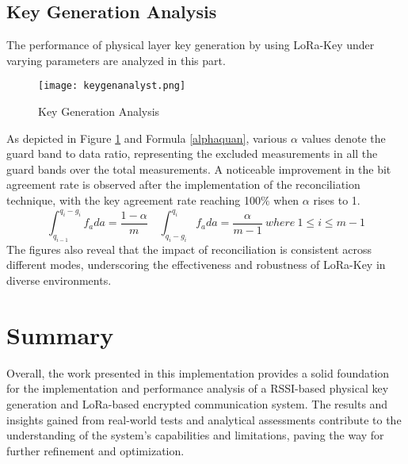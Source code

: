 \subsection{Key Generation Analysis}
The performance of physical layer key generation by using LoRa-Key under varying parameters are analyzed in this part.
\begin{figure}
  \centering
  \texttt{[image: keygenanalyst.png]}
  \caption{Key Generation Analysis}
  \label{keygenanalyst}
\end{figure}
As depicted in Figure \ref{keygenanalyst} and Formula \ref{alphaquan}, various \(\alpha\) values denote the guard band to data ratio, representing the excluded measurements in all the guard bands over the total measurements. A noticeable improvement in the bit agreement rate is observed after the implementation of the reconciliation technique, with the key agreement rate reaching 100$\%$ when \(\alpha\) rises to 1. 
\begin{equation} \int _{q_{i-1}}^{q_{i}-g_{i}} f_{a}da = \frac {1 - \alpha }{m}\quad \int _{q_{i}-g_{i}}^{q_{i}} f_{a}da = \frac {\alpha }{m - 1} {\ } where {\ } 1\leq i\leq {m−1}\label{alphaquan}\end{equation} 
The figures also reveal that the impact of reconciliation is consistent across different modes, underscoring the effectiveness and robustness of LoRa-Key in diverse environments.

\section{Summary}
Overall, the work presented in this implementation provides a solid foundation for the implementation and performance analysis of a RSSI-based physical key generation and LoRa-based encrypted communication system. The results and insights gained from real-world tests and analytical assessments contribute to the understanding of the system's capabilities and limitations, paving the way for further refinement and optimization.
